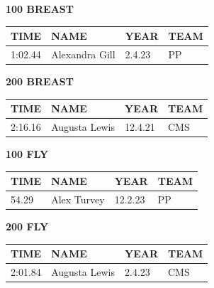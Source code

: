 \begin{table}[H]
\centering
\begin{minipage}[t]{0.48\textwidth}
\centering
\textbf{100 BREAST}\\[0.1cm]
\begin{tabular}{@{}p{1.8cm}p{2.8cm}p{1.2cm}p{1.4cm}@{}}
\hline
    \textbf{TIME} & \textbf{NAME} & \textbf{YEAR} & \textbf{TEAM} \\
\hline
    1:02.44 & Alexandra Gill & 2.4.23 & PP \\
\hline
\end{tabular}
\end{minipage}\hfill
\begin{minipage}[t]{0.48\textwidth}
\centering
\textbf{200 BREAST}\\[0.1cm]
\begin{tabular}{@{}p{1.8cm}p{2.8cm}p{1.2cm}p{1.4cm}@{}}
\hline
    \textbf{TIME} & \textbf{NAME} & \textbf{YEAR} & \textbf{TEAM} \\
\hline
    2:16.16 & Augusta Lewis & 12.4.21 & CMS \\
\hline
\end{tabular}
\end{minipage}
\end{table}

\begin{table}[H]
\centering
\begin{minipage}[t]{0.48\textwidth}
\centering
\textbf{100 FLY}\\[0.1cm]
\begin{tabular}{@{}p{1.8cm}p{2.8cm}p{1.2cm}p{1.4cm}@{}}
\hline
    \textbf{TIME} & \textbf{NAME} & \textbf{YEAR} & \textbf{TEAM} \\
\hline
    54.29 & Alex Turvey & 12.2.23 & PP \\
\hline
\end{tabular}
\end{minipage}\hfill
\begin{minipage}[t]{0.48\textwidth}
\centering
\textbf{200 FLY}\\[0.1cm]
\begin{tabular}{@{}p{1.8cm}p{2.8cm}p{1.2cm}p{1.4cm}@{}}
\hline
    \textbf{TIME} & \textbf{NAME} & \textbf{YEAR} & \textbf{TEAM} \\
\hline
    2:01.84 & Augusta Lewis & 2.4.23 & CMS \\
\hline
\end{tabular}
\end{minipage}
\end{table}

